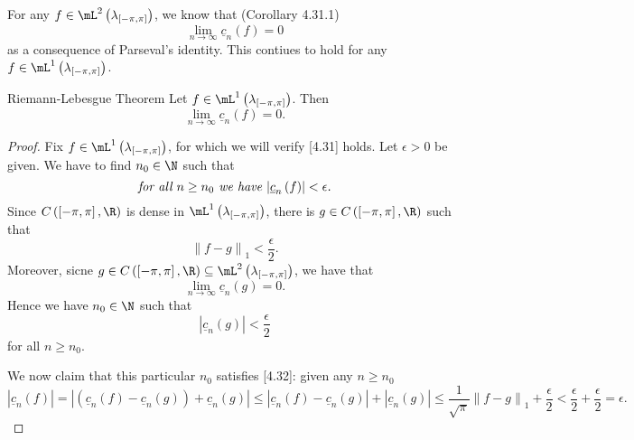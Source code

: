 \documentclass[pmath450]{subfiles}
\begin{document}
    \np For any $f\in\mL^{2}\left( \lambda_{\left[ -\pi,\pi \right]} \right)$, we know that (Corollary 4.31.1)
    \begin{equation*}
        \lim_{n\to\infty}\underline{c}_n\left( f \right) = 0
    \end{equation*}
    as a consequence of Parseval's identity. This contiues to hold for any $f\in\lone\left( \lambda_{\left[ -\pi,\pi \right]} \right)$.

    \begin{theorem}{Riemann-Lebesgue Theorem}
        Let $f\in\lone\left( \lambda_{\left[ -\pi,\pi \right]} \right)$. Then
        \begin{equation}
            \lim_{n\to\infty} \underline{c}_n\left( f \right) = 0.
        \end{equation}
    \end{theorem}
    
    \begin{proof}
        Fix $f\in\lone\left( \lambda_{\left[ -\pi,\pi \right]} \right)$, for which we will verify [4.31] holds. Let $\epsilon>0$ be given. We have to find $n_0\in\N$ such that 
        \begin{equation}
            \text{\textit{for all $n\geq n_0$ we have $\left| \underline{c}_n\left( f \right) \right|<\epsilon$.}}
        \end{equation}
        Since $C\left( \left[ -\pi,\pi \right],\R \right)$ is dense in $\lone\left( \lambda_{\left[ -\pi,\pi \right]} \right)$, there is $g\in C\left( \left[ -\pi,\pi \right],\R \right)$ such that
        \begin{equation*}
            \left\lVert f-g\right\rVert_1 < \frac{\epsilon}{2}.
        \end{equation*}
        Moreover, sicne $g\in C\left( \left[ -\pi,\pi \right],\R \right)\subseteq\mL^{2}\left( \lambda_{\left[ -\pi,\pi \right]} \right)$, we have that
        \begin{equation*}
            \lim_{n\to\infty}\underline{c}_n\left( g \right) = 0.
        \end{equation*}
        Hence we have $n_0\in\N$ such that
        \begin{equation*}
            \left| \underline{c}_n\left( g \right) \right| < \frac{\epsilon}{2}
        \end{equation*}
        for all $n\geq n_0$.

        We now claim that this particular $n_0$ satisfies [4.32]: given any $n\geq n_0$
        \begin{equation*}
            \left| \underline{c}_n\left( f \right) \right| = \left| \left( \underline{c}_n\left( f \right)-\underline{c}_n\left( g \right) \right)+\underline{c}_n\left( g \right) \right| \leq \left| \underline{c}_n\left( f \right)-\underline{c}_n\left( g \right) \right|+\left| \underline{c}_n\left( g \right) \right| \leq \frac{1}{\sqrt{\pi}}\left\lVert f-g \right\rVert_{1} + \frac{\epsilon}{2} < \frac{\epsilon}{2} + \frac{\epsilon}{2} = \epsilon.
        \end{equation*}
    \end{proof}
    
\end{document}
